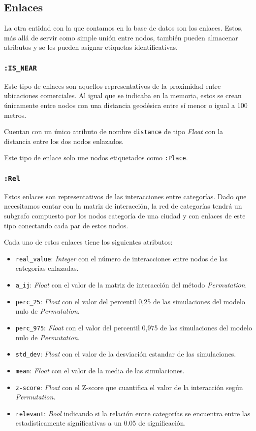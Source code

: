 \subsection{Enlaces}
La otra entidad con la que contamos en la base de datos son los enlaces. Estos, más allá de servir como simple unión entre nodos, también pueden almacenar atributos y se les pueden asignar etiquetas identificativas.

\subsubsection{\texttt{:IS\_NEAR}}
Este tipo de enlaces son aquellos representativos de la proximidad entre ubicaciones comerciales. Al igual que se indicaba en la memoria, estos se crean únicamente entre nodos con una distancia geodésica entre sí menor o igual a 100 metros.

Cuentan con un único atributo de nombre \texttt{distance} de tipo \textit{Float} con la distancia entre los dos nodos enlazados.

Este tipo de enlace solo une nodos etiquetados como \texttt{:Place}.

\subsubsection{\texttt{:Rel}}
Estos enlaces son representativos de las interacciones entre categorías. Dado que necesitamos contar con la matriz de interacción, la red de categorías tendrá un subgrafo compuesto por los nodos categoría de una ciudad y con enlaces de este tipo conectando cada par de estos nodos.

Cada uno de estos enlaces tiene los siguientes atributos:
\begin{itemize}
	\item \texttt{real\_value}: \textit{Integer} con el número de interacciones entre nodos de las categorías enlazadas.
	\item \texttt{a\_ij}: \textit{Float} con el valor de la matriz de interacción del método \textit{Permutation}.
	\item \texttt{perc\_25}: \textit{Float} con el valor del percentil 0,25 de las simulaciones del modelo nulo de \textit{Permutation}.
	\item \texttt{perc\_975}: \textit{Float} con el valor del percentil 0,975 de las simulaciones del modelo nulo de \textit{Permutation}.
	\item \texttt{std\_dev}: \textit{Float} con el valor de la desviación estandar de las simulaciones.
	\item \texttt{mean}: \textit{Float} con el valor de la media de las simulaciones.
	\item \texttt{z-score}: \textit{Float} con el Z-score que cuantifica el valor de la interacción según \textit{Permutation}.
	\item \texttt{relevant}: \textit{Bool} indicando si la relación entre categorías se encuentra entre las estadísticamente significativas a un 0.05 de significación.
\end{itemize}

